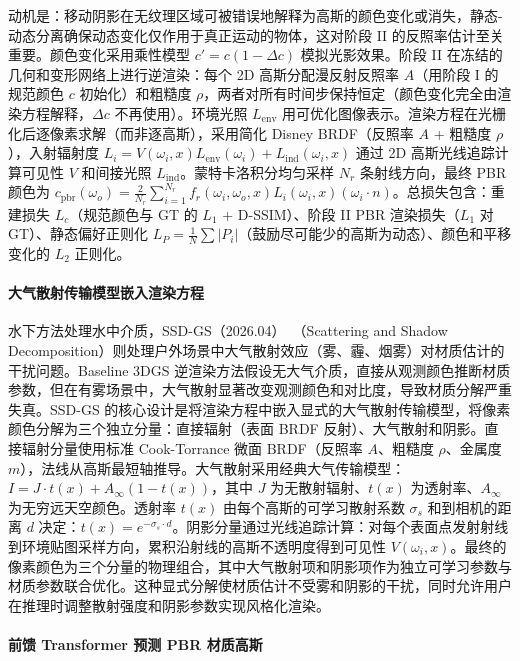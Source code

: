 动机是：移动阴影在无纹理区域可被错误地解释为高斯的颜色变化或消失，静态-动态分离确保动态变化仅作用于真正运动的物体，这对阶段 II 的反照率估计至关重要。颜色变化采用乘性模型 $c' = c(1 - \Delta c)$ 模拟光影效果。阶段 II 在冻结的几何和变形网络上进行逆渲染：每个 2D 高斯分配漫反射反照率 $A$（用阶段 I 的规范颜色 $c$ 初始化）和粗糙度 $\rho$，两者对所有时间步保持恒定（颜色变化完全由渲染方程解释，$\Delta c$ 不再使用）。环境光照 $L_{\text{env}}$ 用可优化图像表示。渲染方程在光栅化后逐像素求解（而非逐高斯），采用简化 Disney BRDF（反照率 $A$ + 粗糙度 $\rho$），入射辐射度 $L_i = V(\omega_i, x) L_{\text{env}}(\omega_i) + L_{\text{ind}}(\omega_i, x)$ 通过 2D 高斯光线追踪计算可见性 $V$ 和间接光照 $L_{\text{ind}}$。蒙特卡洛积分均匀采样 $N_r$ 条射线方向，最终 PBR 颜色为 $c_{\text{pbr}}(\omega_o) = \frac{2}{N_r} \sum_{i=1}^{N_r} f_r(\omega_i, \omega_o, x) L_i(\omega_i, x)(\omega_i \cdot n)$。总损失包含：重建损失 $L_c$（规范颜色与 GT 的 $L_1$ + D-SSIM）、阶段 II PBR 渲染损失（$L_1$ 对 GT）、静态偏好正则化 $L_P = \frac{1}{N} \sum |P_i|$（鼓励尽可能少的高斯为动态）、颜色和平移变化的 $L_2$ 正则化。

\paragraph{大气散射传输模型嵌入渲染方程}

水下方法处理水中介质，SSD-GS（2026.04）~\cite{2604_13333}（Scattering and Shadow Decomposition）则处理户外场景中大气散射效应（雾、霾、烟雾）对材质估计的干扰问题。Baseline 3DGS 逆渲染方法假设无大气介质，直接从观测颜色推断材质参数，但在有雾场景中，大气散射显著改变观测颜色和对比度，导致材质分解严重失真。SSD-GS 的核心设计是将渲染方程中嵌入显式的大气散射传输模型，将像素颜色分解为三个独立分量：直接辐射（表面 BRDF 反射）、大气散射和阴影。直接辐射分量使用标准 Cook-Torrance 微面 BRDF（反照率 $A$、粗糙度 $\rho$、金属度 $m$），法线从高斯最短轴推导。大气散射采用经典大气传输模型：$I = J \cdot t(x) + A_{\infty}(1 - t(x))$，其中 $J$ 为无散射辐射、$t(x)$ 为透射率、$A_{\infty}$ 为无穷远天空颜色。透射率 $t(x)$ 由每个高斯的可学习散射系数 $\sigma_s$ 和到相机的距离 $d$ 决定：$t(x) = e^{-\sigma_s \cdot d}$。阴影分量通过光线追踪计算：对每个表面点发射射线到环境贴图采样方向，累积沿射线的高斯不透明度得到可见性 $V(\omega_i, x)$。最终的像素颜色为三个分量的物理组合，其中大气散射项和阴影项作为独立可学习参数与材质参数联合优化。这种显式分解使材质估计不受雾和阴影的干扰，同时允许用户在推理时调整散射强度和阴影参数实现风格化渲染。

\paragraph{前馈 Transformer 预测 PBR 材质高斯}

